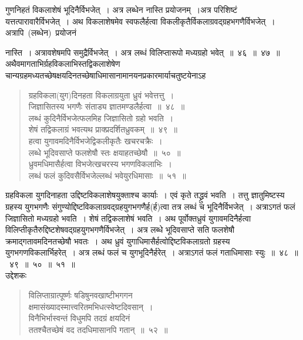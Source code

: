 \documentclass[11pt, openany]{book}
\begin{document}
\indent
गुणनिहतं विकलाशेषं भूदिनैर्विभजेत्~। अत्र लब्धेन नास्ति प्रयोजनम्~।अत्र परिशिष्टं यत्तत्पारावारैर्विभजेत्~। अथ विकलाशेषमेव स्वफलैर्हत्वा विकलीकृतैर्विकलाग्रवद्ग्रहभगणैर्विभजेत्~। अत्रापि~(लब्धेन)~प्रयोजनं


\newpage
\thispagestyle{fancy}
\fancyhf{}
\noindent
नास्ति~। अत्रावशेषमपि समुद्रैर्विभजेत्~। अत्र लब्धं विलिप्तारूपो मध्यग्रहो भवेत्~॥~४६~॥~४७~॥\\

\indent
अथैवमागताभिर्ग्रहविकलाभिस्तद्विकलाशेषेण चान्यग्रहमध्यतच्छेषक्षयदिनतच्छेषाधिमासानामानयनप्रकारमार्याचतुष्टयेनाऽह \textendash\begin{quote}

{\ks ग्रहविकला(युग)दिनहता विकलाग्रयुता ध्रुवं भवेत्तत्तु~।\\
जिज्ञासितस्य भगणैः संताड्य ज्ञातमण्डलैर्हत्वा~॥~४८~॥\\
लब्धं कुदिनैर्विभजेत्फलमिह जिज्ञासितो ग्रहो भवति~।\\
शेषं तद्विकलाग्रं भवत्यथ प्राक्प्रदर्शितध्रुवकम्~॥~४९~॥\\
हत्वा युगावमदिनैर्विभजेद्विकलीकृतैः खचरचक्रैः~।\\
लब्धे भूदिवसाप्ते फलशेषौ स्तः क्षयाहतच्छेषौ~॥~५०~॥\\
ध्रुवमधिमासैर्हत्वा विभजेत्खचरस्य भगणविकलाभिः~।\\
लब्धं फलं कुदिवसैर्विभजेल्लब्धं भवेयुरधिमासाः~॥~५१~॥}
\end{quote}

\indent
ग्रहविकला युगदिनाहता उद्दिष्टविकलाशेषयुक्ताश्च कार्याः~। एवं कृते तद्ध्रुवं भवति~। तत्तु ज्ञातुमिष्टस्य ग्रहस्य युगभगणैः संगुण्योद्दिष्टविकलाग्रवद्ग्रहयुगभगणैर्ह(र्ह)त्वा तत्र लब्धं च भूदिनैर्विभजेत्~। अत्राऽगतं फलं जिज्ञासितो मध्यग्रहो भवति~। शेषं तद्विकलाशेषं भवति~। अथ पूर्वोक्तध्रुवं युगावमदिनैर्हत्वा विलिप्तीकृतैरुद्दिष्टशेषवद्ग्रहयुगभगणैर्विभजेत्~। अत्र लब्धे भूदिवसाप्ते सति फलशेषौ क्रमाद्गतावमदिनतच्छेषौ भवतः~। अथ ध्रुवं युगाधिमासैर्हत्वोद्दिष्टविकलाग्रतो ग्रहस्य युगभगणविकलार्भिहरेत्~। अत्र लब्धं फलं च युगभूदिनैर्हरेत्~। अत्राऽगतं फलं गताधिमासाः स्युः~॥~४८~॥~४९~॥~५०~॥~५१~॥\\

\indent
उद्देशकः\textendash

\begin{quote}
 {\ku विलिप्ताग्रात्पूर्ष्णः षडिषुनवखाष्टीभगगन\textendash\\
क्षमासंख्यादस्मात्त्वरितमभिधत्स्वेष्टदिवसान्~।\\
विनैभिर्भास्वन्तं विधुमपि तदग्रं क्षयदिनं\\
ततश्चैतच्छेषं वद तदधिमासानपि गतान्~॥~५२~॥}
\end{quote}
\end{document}
